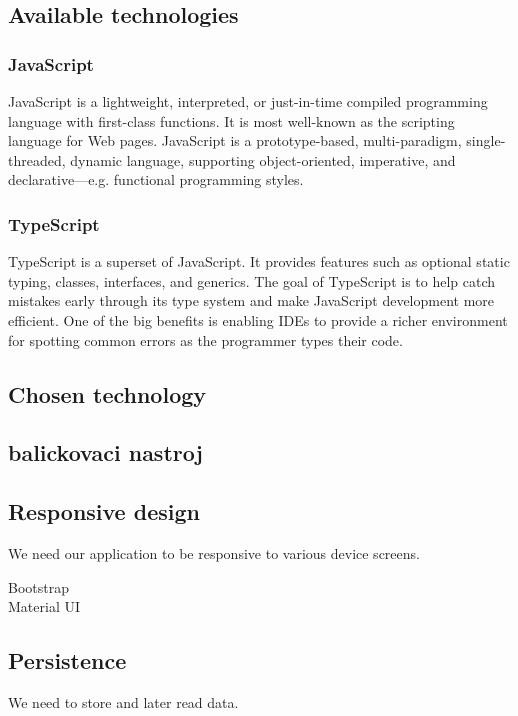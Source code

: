 \subsection*{Available technologies}

\subsubsection*{JavaScript}
JavaScript is a lightweight, interpreted, or just-in-time compiled programming language with first-class functions. 
It is most well-known as the scripting language for Web pages. 
JavaScript is a prototype-based, multi-paradigm, single-threaded, dynamic language, supporting object-oriented, imperative, and declarative---e.g. functional programming styles.

\subsubsection*{TypeScript}
TypeScript is a superset of JavaScript. 
It provides features such as optional static typing, classes, interfaces, and generics. 
The goal of TypeScript is to help catch mistakes early through its type system and make JavaScript development more efficient. 
One of the big benefits is enabling IDEs to provide a richer environment for spotting common errors as the programmer types their code.

\subsection*{Chosen technology}


\subsection{balickovaci nastroj}

\subsection{Responsive design}
We need our application to be responsive to various device screens.
\begin{description}
  \item[Bootstrap] 
  \item[Material UI] 
\end{description}

\subsection{Persistence}
We need to store and later read data.


